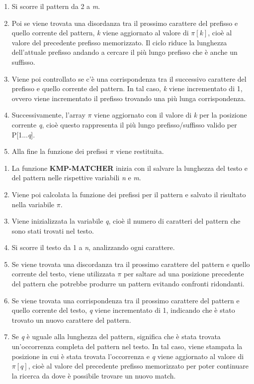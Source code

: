 \documentclass{article}
\begin{document}
\begin{itemize}
\begin{enumerate}[label=\arabic*a.]
              \item Si scorre il pattern da 2 a \textit{m}.
              \item Poi se viene trovata una disordanza tra il prossimo carattere del prefisso e quello corrente del pattern, \textit{k} viene aggiornato al valore di $\pi[k]$, cioè al valore del precedente prefisso memorizzato. Il ciclo riduce la lunghezza dell'attuale prefisso andando a cercare il più lungo prefisso che è anche un suffisso.
              \item Viene poi controllato se c'è una corrispondenza tra il successivo carattere del prefisso e quello corrente del pattern. In tal caso, \textit{k} viene incrementato di 1, ovvero viene incrementato il prefisso trovando una più lunga corrispondenza.
              \item Successivamente, l'array $\pi$ viene aggiornato con il valore di \textit{k} per la posizione corrente \textit{q}, cioè questo rappresenta il più lungo prefisso/suffisso valido per P[1...\textit{q}].
              \item Alla fine la funzione dei prefissi $\pi$ viene restituita.
          \end{enumerate}
          \begin{enumerate}[label=\arabic*b.]
              \item La funzione \textbf{KMP-MATCHER} inizia con il salvare la lunghezza del testo e del pattern nelle rispettive variabili \textit{n} e \textit{m}.
              \item Viene poi calcolata la funzione dei prefissi per il pattern e salvato il risultato nella variabile $\pi$.
              \item Viene inizializzata la variabile \textit{q}, cioè il numero di caratteri del pattern che sono stati trovati nel testo.
              \item Si scorre il testo da 1 a \textit{n}, analizzando ogni carattere.
              \item Se viene trovata una discordanza tra il prossimo carattere del pattern e quello corrente del testo, viene utilizzata $\pi$ per saltare ad una posizione precedente del pattern che potrebbe produrre un pattern evitando confronti ridondanti.
              \item Se viene trovata una corrispondenza tra il prossimo carattere del pattern e quello corrente del testo, \textit{q} viene incrementato di 1, indicando che è stato trovato un nuovo carattere del pattern.
              \item Se \textit{q} è uguale alla lunghezza del pattern, significa che è stata trovata un'occorrenza completa del pattern nel testo. In tal caso, viene stampata la posizione in cui è stata trovata l'occorrenza e \textit{q} viene aggiornato al valore di $\pi[q]$, cioè al valore del precedente prefisso memorizzato per poter continuare la ricerca da dove è possibile trovare un nuovo match.

\end{enumerate}
\end{itemize}
\end{document}
